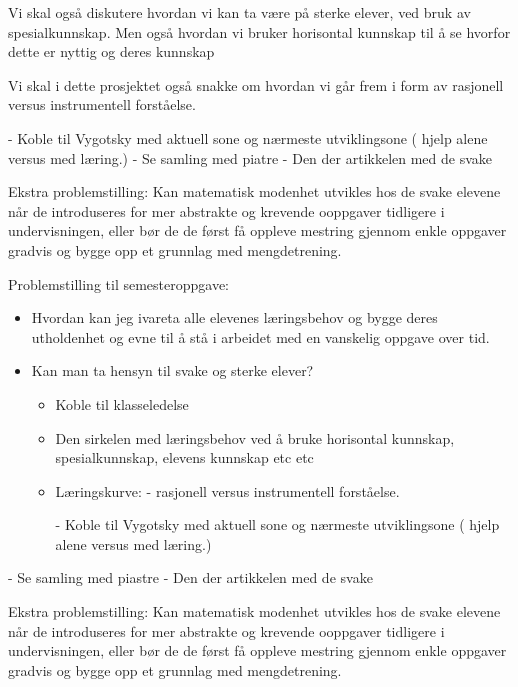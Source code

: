 \documentclass[12pt,a4paper]{article}
\begin{document}
Vi skal også diskutere hvordan vi kan ta være på sterke elever, ved bruk av spesialkunnskap.
Men også hvordan vi bruker horisontal kunnskap til å se hvorfor dette er nyttig og deres kunnskap


Vi skal i dette prosjektet også snakke om hvordan vi går frem i form av rasjonell versus instrumentell forståelse. 

- Koble til Vygotsky med aktuell sone og nærmeste utviklingsone ( hjelp alene versus med læring.)
- Se samling med piatre
- Den der artikkelen med de svake



Ekstra problemstilling:
Kan matematisk modenhet utvikles hos de svake elevene når de introduseres for mer abstrakte og krevende ooppgaver
tidligere i undervisningen, eller
bør de de først få oppleve mestring gjennom enkle oppgaver gradvis og bygge opp et grunnlag med mengdetrening.


\begin{tcolorbox}
    
\label{sec:problemstilling_til_semesteroppgave}


Problemstilling til semesteroppgave:
\begin{itemize}
    \item
Hvordan kan jeg ivareta alle elevenes læringsbehov og bygge deres utholdenhet og evne til å stå i arbeidet med en
vanskelig oppgave over tid.

\item Kan man ta hensyn til svake og sterke elever?
    \begin{itemize}
        \item Koble til klasseledelse
        \item Den sirkelen med læringsbehov ved å bruke horisontal kunnskap, spesialkunnskap, elevens kunnskap etc etc
        \item  Læringskurve: - rasjonell versus instrumentell forståelse.

            - Koble til Vygotsky med aktuell sone og nærmeste utviklingsone ( hjelp alene versus med læring.)
    \end{itemize}
\end{itemize}





- Se samling med piastre
- Den der artikkelen med de svake



Ekstra problemstilling:
Kan matematisk modenhet utvikles hos de svake elevene når de introduseres for mer abstrakte og krevende ooppgaver
tidligere i undervisningen, eller
bør de de først få oppleve mestring gjennom enkle oppgaver gradvis og bygge opp et grunnlag med mengdetrening.
    
\end{tcolorbox}
\end{document}
